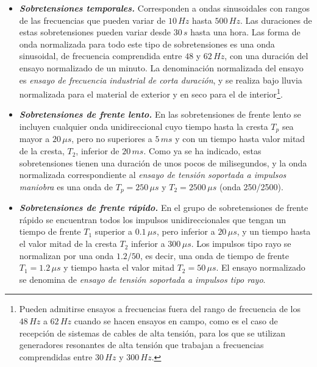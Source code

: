             \begin{itemize}
                \item \textbf{\textit{Sobretensiones temporales.}} Corresponden a
                ondas sinusoidales con rangos de las frecuencias que pueden variar de $10\,\textit{Hz}$ hasta $500\,\textit{Hz}$. Las duraciones de estas sobretensiones pueden variar desde $30\,\textit{s}$ hasta una hora. Las forma de onda normalizada para todo este tipo de sobretensiones es una onda sinusoidal, de frecuencia comprendida entre $48$ y $62\,\textit{Hz}$, con una duración del ensayo normalizado de un minuto. La denominación normalizada del ensayo es \textit{ensayo de frecuencia industrial de corta duración}, y se realiza bajo lluvia normalizada para el material de exterior y en seco para el de interior\footnote{Pueden admitirse ensayos a frecuencias fuera del rango de frecuencia de los $48\,\textit{Hz}$ a $62\,\textit{Hz}$ cuando se hacen ensayos en campo, como es el caso de recepción de sistemas de cables de alta tensión, para los que se utilizan generadores resonantes de alta tensión que trabajan a frecuencias comprendidas entre $30\,\textit{Hz}$ y $300\,\textit{Hz}$.}.
                
                \item \textbf{\textit{Sobretensiones de frente lento.}} En las sobretensiones de frente lento se incluyen cualquier onda unidireccional cuyo tiempo hasta la cresta $T_\textit{p}$ sea mayor a $20\,\mu\textit{s}$, pero no superiores a $5\,\textit{ms}$ y con un tiempo hasta valor mitad de la cresta, $T_2$, inferior de $20\,\textit{ms}$. Como ya se ha indicado, estas sobretensiones tienen una duración de unos pocos de milisegundos, y la onda normalizada correspondiente al \textit{ensayo de tensión soportada a impulsos maniobra} es una onda de $T_\textit{p} = 250\,\mu\textit{s}$ y $T_2=2500\,\mu\textit{s}$ (onda 250/2500).
                
                \item \textbf{\textit{Sobretensiones de frente rápido.}} En el grupo de sobretensiones de frente rápido se encuentran todos los impulsos unidireccionales que tengan un tiempo de frente $T_1$ superior a $0.1\,\mu\textit{s}$, pero inferior a $20\,\mu\textit{s}$, y un tiempo hasta el valor mitad de la cresta $T_2$ inferior a $300\,\mu\textit{s}$. Los impulsos tipo rayo se normalizan por una onda $1.2/50$, es decir, una onda de tiempo de frente $T_1=1.2\,\mu\textit{s}$ y tiempo hasta el valor mitad $T_2=50\,\mu\textit{s}$. El ensayo normalizado se denomina de \textit{ensayo de tensión soportada a impulsos tipo rayo}.
                

\end{itemize}
